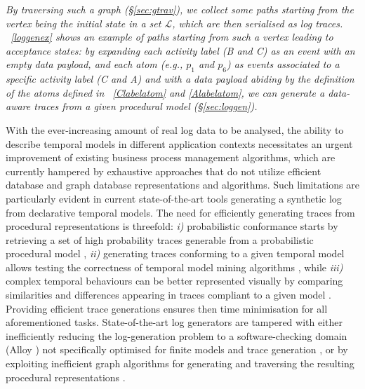 \documentclass[acmengage]{acmart}
\begin{document}
\textit{By traversing such a graph (\S\ref{sec:gtrav}), we collect some paths starting from the vertex being the initial state in a set $\mathcal{L}$, which are then serialised as log traces. \figurename~\ref{loggenex} shows an example of paths starting from such a vertex leading to acceptance states: by expanding each activity label (\textsf{B} and \textsf{C}) as an event with an empty data payload, and  each atom (e.g., $p_1$ and $p_6$) as events associated to a specific activity label (\textsf{C} and \textsf{A}) and with a data payload abiding by the definition of the atoms defined in \tablename~\ref{Clabelatom} and \ref{Alabelatom}, we can generate a data-aware traces  from a given procedural model  (\S\ref{sec:loggen}).}



With the ever-increasing amount of real log data to be analysed, the ability to describe temporal models in different application contexts necessitates an urgent improvement of existing business process management algorithms, which are currently hampered by exhaustive approaches that do not utilize efficient database and graph database representations and algorithms. Such limitations are particularly evident in current state-of-the-art tools generating a synthetic log from declarative temporal models. The need for efficiently generating traces from procedural representations is threefold: \textit{i)} probabilistic conformance starts by retrieving a set of high probability  traces generable from a probabilistic procedural model \cite{DBLP:conf/icpm/BergamiMMP21}, \textit{ii)} generating traces conforming to a given temporal model allows testing the correctness of temporal model mining algorithms \cite{DBLP:conf/caise/CiccioBCM15,DBLP:conf/ideas/ApplebyBM23}, while \textit{iii)} complex temporal  behaviours can be better represented visually by comparing similarities and differences appearing in traces compliant to a given model \cite{8387499}. Providing efficient trace generations ensures then time minimisation for all aforementioned tasks. State-of-the-art log generators are tampered with either inefficiently reducing the log-generation problem to a software-checking domain ({Alloy} \cite{DBLP:books/daglib/0024034}) not specifically optimised for finite models  and trace generation \cite{DBLP:conf/bpm/SkydanienkoFGM18}, or by exploiting inefficient graph algorithms for generating and traversing the resulting procedural representations \cite{DBLP:conf/caise/CiccioBCM15}. 
\end{document}
